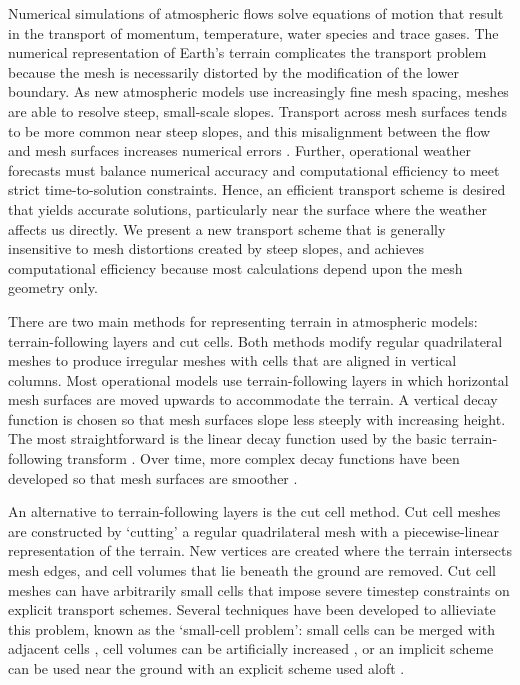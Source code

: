 Numerical simulations of atmospheric flows solve equations of motion that result in the transport of momentum, temperature, water species and trace gases.  The numerical representation of Earth's terrain complicates the transport problem because the mesh is necessarily distorted by the modification of the lower boundary.
As new atmospheric models use increasingly fine mesh spacing, meshes are able to resolve steep, small-scale slopes.  Transport across mesh surfaces tends to be more common near steep slopes, and this misalignment between the flow and mesh surfaces increases numerical errors \citep{schaer2002,shaw-weller2016}.
Further, operational weather forecasts must balance numerical accuracy and computational efficiency to meet strict time-to-solution constraints.  Hence, an efficient transport scheme is desired that yields accurate solutions, particularly near the surface where the weather affects us directly.
We present a new transport scheme that is generally insensitive to mesh distortions created by steep slopes, and achieves computational efficiency because most calculations depend upon the mesh geometry only.

There are two main methods for representing terrain in atmospheric models: terrain-following layers and cut cells.  Both methods modify regular quadrilateral meshes to produce irregular meshes with cells that are aligned in vertical columns.  Most operational models use terrain-following layers in which horizontal mesh surfaces are moved upwards to accommodate the terrain.  A vertical decay function is chosen so that mesh surfaces slope less steeply with increasing height.
The most straightforward is the linear decay function used by the basic terrain-following transform \citep{galchen-somerville1975}.  Over time, more complex decay functions have been developed so that mesh surfaces are smoother \citep{simmons-burridge1981,schaer2002,leuenberger2010,klemp2011}.

An alternative to terrain-following layers is the cut cell method.  Cut cell meshes are constructed by `cutting' a regular quadrilateral mesh with a piecewise-linear representation of the terrain.  New vertices are created where the terrain intersects mesh edges, and cell volumes that lie beneath the ground are removed.  Cut cell meshes can have arbitrarily small cells that impose severe timestep constraints on explicit transport schemes.  Several techniques have been developed to allieviate this problem, known as the `small-cell problem': small cells can be merged with adjacent cells \citep{yamazaki2016}, cell volumes can be artificially increased \citep{steppeler2002}, or an implicit scheme can be used near the ground with an explicit scheme used aloft \citep{jebens2011}.

